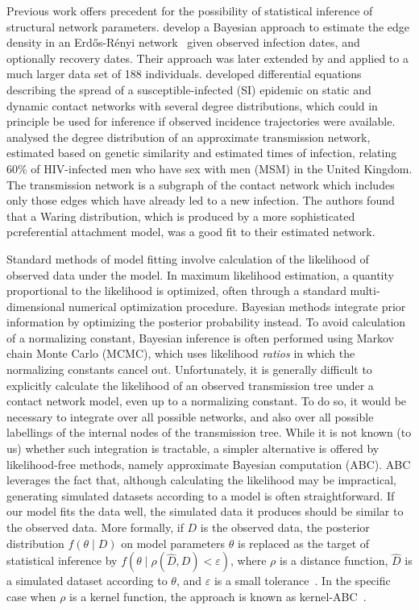 \documentclass[12pt]{article}\usepackage[]{graphicx}\usepackage[]{color}
\begin{document}
Previous work offers precedent for the possibility of statistical inference of
structural network parameters. \textcite{britton2002bayesian} develop a Bayesian
approach to estimate the edge density in an Erd\H{o}s-R\'enyi
network~\autocite{erdos1960evolution} given observed infection dates, and
optionally recovery dates. Their approach was later extended by
\textcite{groendyke2011bayesian} and applied to a much larger data set of 188
individuals. \textcite{volz2007susceptible, volz2008sir} developed differential
equations describing the spread of a susceptible-infected (SI) epidemic on
static and dynamic contact networks with several degree distributions, which
could in principle be used for inference if observed incidence trajectories
were available. \textcite{brown2011transmission} analysed the degree distribution
of an approximate transmission network, estimated based on genetic similarity
and estimated times of infection, relating 60\% of HIV-infected men who have
sex with men (MSM) in the United Kingdom. The transmission network is a
subgraph of the contact network which includes only those edges which have
already led to a new infection. The authors found that a Waring distribution,
which is produced by a more sophisticated pcreferential attachment model, was a
good fit to their estimated network. 

Standard methods of model fitting involve calculation of the likelihood of
observed data under the model. In maximum likelihood estimation, a quantity
proportional to the likelihood is optimized, often through a standard
multi-dimensional numerical optimization procedure. Bayesian methods integrate
prior information by optimizing the posterior probability instead. To avoid
calculation of a normalizing constant, Bayesian inference is often performed
using Markov chain Monte Carlo (MCMC), which uses likelihood \emph{ratios} in
which the normalizing constants cancel out. Unfortunately, it is generally
difficult to explicitly calculate the likelihood of an observed transmission
tree under a contact network model, even up to a normalizing constant. To do
so, it would be necessary to integrate over all possible networks, and also
over all possible labellings of the internal nodes of the transmission tree.
While it is not known (to us) whether such integration is tractable, a simpler
alternative is offered by likelihood-free methods, namely approximate Bayesian
computation (ABC). ABC leverages the fact that, although calculating the
likelihood may be impractical, generating simulated datasets according to a
model is often straightforward. If our model fits the data well, the simulated
data it produces should be similar to the observed data. More formally, if $D$
is the observed data, the posterior distribution $f(\theta \mid D)$ on model
parameters $\theta$ is replaced as the target of statistical inference by
$f(\theta \mid \rho(\hat{D}, D) < \varepsilon)$, where $\rho$ is a distance
function, $\hat{D}$ is a simulated dataset according to $\theta$, and
$\varepsilon$ is a small tolerance~\autocite{sunnaaker2013approximate}. In the
specific case when $\rho$ is a kernel function, the approach is known as
kernel-ABC~\autocite{nakagome2013kernel, poon2015phylodynamic}.
\end{document}
